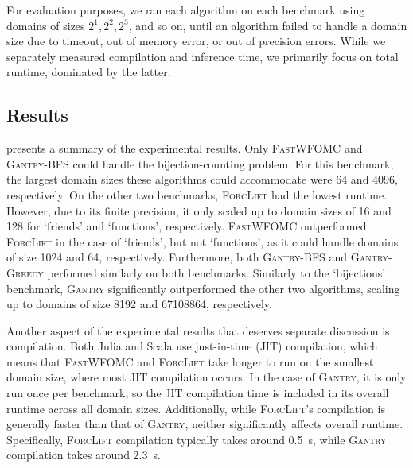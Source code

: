 \documentclass[letterpaper]{article} %
\theoremstyle{remark}
\theoremstyle{definition}
\newcommand{\Cranetwo}{\textsc{Gantry}}
\newcommand{\Cranebfs}{\textsc{Gantry-BFS}}
\newcommand{\Cranegreedy}{\textsc{Gantry-Greedy}}
\begin{document}
For evaluation purposes, we ran each algorithm on each benchmark using domains
of sizes $2^{1}, 2^{2}, 2^{3}$, and so on, until an algorithm failed to handle a
domain size due to timeout, out of memory error, or out of precision errors.
While we separately measured compilation and inference time, we primarily focus
on total runtime, dominated by the latter.





\subsection{Results}
 presents a summary of the experimental results. Only
\textsc{FastWFOMC} and \Cranebfs{} could handle the bijection-counting problem.
For this benchmark, the largest domain sizes these algorithms could accommodate
were \num{64} and \num{4096}, respectively. On the other two benchmarks,
\textsc{ForcLift} had the lowest runtime. However, due to its finite precision,
it only scaled up to domain sizes of \num{16} and \num{128} for `friends' and
`functions', respectively. \textsc{FastWFOMC} outperformed \textsc{ForcLift} in
the case of `friends', but not `functions', as it could handle domains of size
\num{1024} and \num{64}, respectively. Furthermore, both \Cranebfs{} and
\Cranegreedy{} performed similarly on both benchmarks. Similarly to the
`bijections' benchmark, \Cranetwo{} significantly outperformed the other two
algorithms, scaling up to domains of size \num{8192} and \num{67108864},
respectively.

Another aspect of the experimental results that deserves separate discussion is
compilation. Both Julia and Scala use just-in-time (JIT) compilation, which
means that \textsc{FastWFOMC} and \textsc{ForcLift} take longer to run on the
smallest domain size, where most JIT compilation occurs. In the case of
\Cranetwo{}, it is only run once per benchmark, so the JIT compilation time is
included in its overall runtime across all domain sizes. Additionally, while
\textsc{ForcLift}'s compilation is generally faster than that of \Cranetwo{},
neither significantly affects overall runtime. Specifically, \textsc{ForcLift}
compilation typically takes around \SI{0.5}{\second}, while \Cranetwo{}
compilation takes around \SI{2.3}{\second}.
\end{document}
